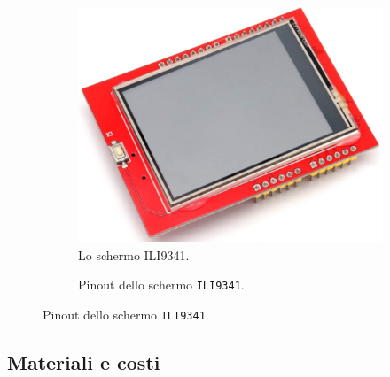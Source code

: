 \documentclass[a4paper]{article}
\begin{document}
\begin{figure}[h]
    \begin{subfigure}[b]{0.45\textwidth}
        \begin{center}
            \includegraphics[scale=0.4]{figures/ili9341.png}
        \end{center}
        \caption{Lo schermo ILI9341.}
        \label{fig:ili9341}
    \end{subfigure}
    \hfill
    \begin{subfigure}[b]{0.45\textwidth}
        \begin{center}
            \begin{tikzpicture}[x=0.015cm, y=0.015cm, scale=0.75, transform shape]
                
            \end{tikzpicture}
        \end{center}
        \caption{Pinout dello schermo \texttt{ILI9341}.}
        \label{fig:pinout_ili}
    \end{subfigure}
\end{figure}

\subsection{Materiali e costi} %
\end{document}
